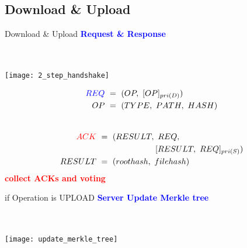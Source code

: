 \subsection{Download \& Upload}
\begin{frame}{Download \& Upload}
	\centering
	\textcolor{blue}{\textbf{Request \& Response}}\\
	~\\
	~\\
	\begin{minipage}{.45\textwidth}
        \texttt{[image: 2\_step\_handshake]}
    \end{minipage}%
	\begin{minipage}{.55\textwidth}
    	\footnotesize
		\centering
		\begin{equation*} \label{eq1}
                \begin{split}
                        \textcolor{blue}{REQ}\ & =\ (OP,\ [OP]_{pri(D)}) \\
                        OP\ & =\ (TYPE,\ PATH,\ HASH) \\
                \end{split}
        \end{equation*}
        \divider{}\\
        \begin{equation*} \label{eq2}
                \begin{split}
                        \textcolor{red}{ACK}\ & =\ (RESULT,\ REQ,\\
                        & \tab{}\tab{}[RESULT,\ REQ]_{pri(S)}) \\
                        RESULT\ & =\ (roothash,\ filehash)
                \end{split}
        \end{equation*}
        \textcolor{red}{\textbf{collect ACKs and voting}}
    \end{minipage}%
\end{frame}

\begin{frame}{if Operation is UPLOAD}
	\centering
	\textcolor{blue}{\textbf{Server Update Merkle tree}}\\
	~\\
	~\\
	\begin{center}
		\texttt{[image: update\_merkle\_tree]}
	\end{center}
\end{frame}

